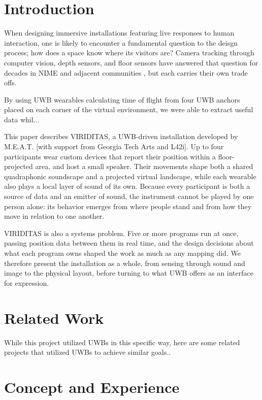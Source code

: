 \documentclass[sigconf]{nimeart}
\begin{document}
\section{Introduction}

When designing immersive installations featuring live responses to human interaction, one is likely to encounter a fundamental question to the deisgn process; how does a space know where its visitors are? Camera tracking through computer vision, depth sensors, and floor sensors have answered that question for decades in NIME and adjacent communities \cite{alshamraniCollaborativeSoundInstallation2026} \cite{frissonLoopJamTurningDance2012}, but each carries their own trade offs. 

By using UWB wearables calculating time of flight from four UWB anchors placed on each corner of the virtual environment, we were able to extract useful data whil...

This paper describes VIRIDITAS, a UWB-driven installation developed by M.E.A.T. [with support from Georgia Tech Arts and L42i]. Up to four participants wear custom devices that report their position within a floor-projected area, and host a small speaker. Their movements shape both a shared quadraphonic soundscape and a projected virtual landscape, while each wearable also plays a local layer of sound of its own. Because every participant is both a source of data and an emitter of sound, the instrument cannot be played by one person alone: its behavior emerges from where people stand and from how they move in relation to one another.

VIRIDITAS is also a systems problem. Five or more programs run at once, passing position data between them in real time, and the design decisions about what each program owns shaped the work as much as any mapping did. We therefore present the installation as a whole, from sensing through sound and image to the physical layout, before turning to what UWB offers as an interface for expression.

\section{Related Work}

While this project utilized UWBs in this specific way, here are some related projects that utilized UWBs to achieve similar goals.. 

\section{Concept and Experience}
\end{document}

